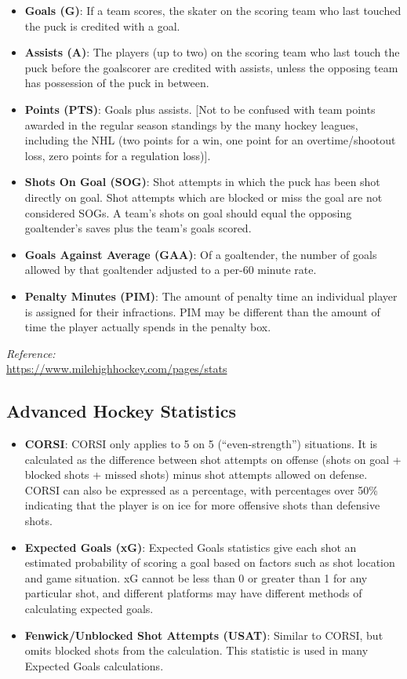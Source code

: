 \documentclass[
  11pt,
]{book}
\theoremstyle{definition}
\theoremstyle{definition}
\theoremstyle{definition}
\theoremstyle{definition}
\theoremstyle{remark}
\begin{document}
\begin{itemize}
\item
  \textbf{Goals (G)}: If a team scores, the skater on the scoring team who last touched the puck is credited with a goal.
\item
  \textbf{Assists (A)}: The players (up to two) on the scoring team who last touch the puck before the goalscorer are credited with assists, unless the opposing team has possession of the puck in between.
\item
  \textbf{Points (PTS)}: Goals plus assists. {[}Not to be confused with team points awarded in the regular season standings by the many hockey leagues, including the NHL (two points for a win, one point for an overtime/shootout loss, zero points for a regulation loss){]}.
\item
  \textbf{Shots On Goal (SOG)}: Shot attempts in which the puck has been shot directly on goal. Shot attempts which are blocked or miss the goal are not considered SOGs. A team's shots on goal should equal the opposing goaltender's saves plus the team's goals scored.
\item
  \textbf{Goals Against Average (GAA)}: Of a goaltender, the number of goals allowed by that goaltender adjusted to a per-60 minute rate.
\item
  \textbf{Penalty Minutes (PIM)}: The amount of penalty time an individual player is assigned for their infractions. PIM may be different than the amount of time the player actually spends in the penalty box.
\end{itemize}

\emph{Reference:}\\
\url{https://www.milehighhockey.com/pages/stats}

\hypertarget{advanced-hockey-statistics}{%
\subsection{Advanced Hockey Statistics}\label{advanced-hockey-statistics}}

\begin{itemize}
\item
  \textbf{CORSI}: CORSI only applies to 5 on 5 (``even-strength'') situations. It is calculated as the difference between shot attempts on offense (shots on goal + blocked shots + missed shots) minus shot attempts allowed on defense. CORSI can also be expressed as a percentage, with percentages over 50\% indicating that the player is on ice for more offensive shots than defensive shots.
\item
  \textbf{Expected Goals (xG)}: Expected Goals statistics give each shot an estimated probability of scoring a goal based on factors such as shot location and game situation. xG cannot be less than 0 or greater than 1 for any particular shot, and different platforms may have different methods of calculating expected goals.
\item
  \textbf{Fenwick/Unblocked Shot Attempts (USAT)}: Similar to CORSI, but omits blocked shots from the calculation. This statistic is used in many Expected Goals calculations.
\end{itemize}
\end{document}
